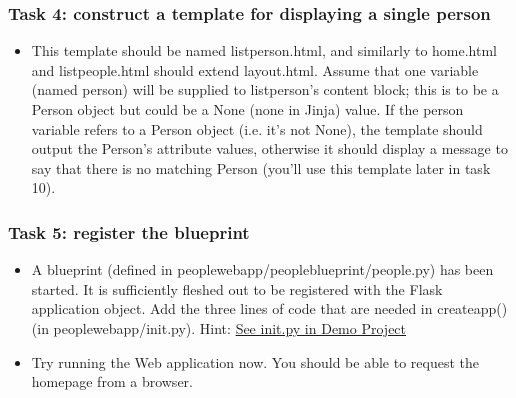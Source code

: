 \documentclass{beamer}
\begin{document}
	\begin{frame}
		\frametitle{Task 4: construct a template for displaying a single person }
		\begin{itemize}
			\item This template should be named list\textunderscore{}person.html, and similarly to home.html and list\textunderscore{}people.html should extend layout.html. Assume that one variable (named person) will be supplied to list\textunderscore{}person’s content block; this is to be a Person object but could be a None (none in Jinja) value. If the person variable refers to a Person object (i.e. it’s not None), the template should output the Person’s attribute values, otherwise it should display a message to say that there is no matching Person (you’ll use this template later in task 10).
		\end{itemize}
	\end{frame}

	\begin{frame}
		\frametitle{Task 5: register the blueprint}
		\begin{itemize}
			\item A blueprint (defined in people\textunderscore{}web\textunderscore{}app/people\textunderscore{}blueprint/people.py) has been started. It is sufficiently fleshed out to be registered with the Flask application object. Add the three lines of code that are needed in create\textunderscore{}app() (in people\textunderscore{}web\textunderscore{}app/\textunderscore{}\textunderscore{}init\textunderscore{}\textunderscore{}.py). Hint:  \href{https://github.com/martinurschler/2021CompSci235-03-CovidWebApp}{See \textunderscore{}\textunderscore{}init\textunderscore{}\textunderscore{}.py in Demo Project}
			\item Try running the Web application now. You should be able to request the homepage from a browser.

		\end{itemize}
	\end{frame}
\end{document}
